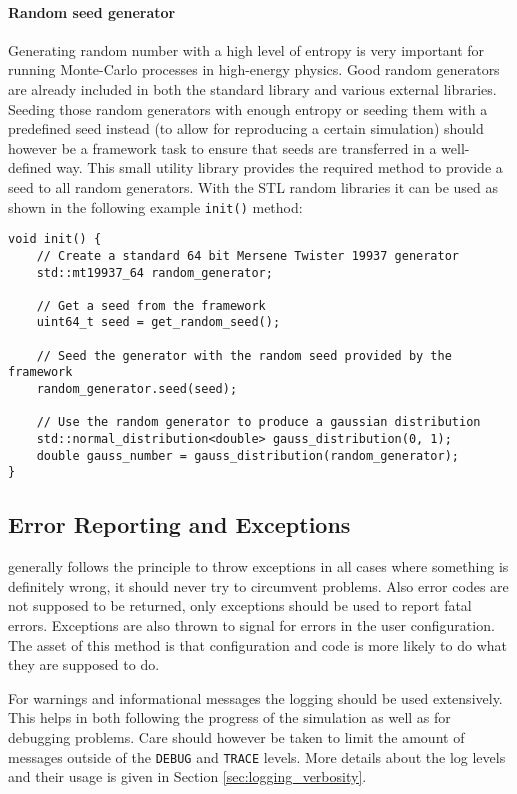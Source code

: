 \paragraph{Random seed generator}
\label{sec:random_generator}
Generating random number with a high level of entropy is very important for running Monte-Carlo processes in high-energy physics. Good random generators are already included in both the standard library and various external libraries. Seeding those random generators with enough entropy or seeding them with a predefined seed instead (to allow for reproducing a certain simulation) should however be a framework task to ensure that seeds are transferred in a well-defined way. This small utility library provides the required method to provide a seed to all random generators. With the STL random libraries it can be used as shown in the following example \texttt{init()} method:

\begin{verbatim}
void init() {
    // Create a standard 64 bit Mersene Twister 19937 generator
    std::mt19937_64 random_generator;
    
    // Get a seed from the framework
    uint64_t seed = get_random_seed();
    
    // Seed the generator with the random seed provided by the framework
    random_generator.seed(seed);
    
    // Use the random generator to produce a gaussian distribution
    std::normal_distribution<double> gauss_distribution(0, 1);
    double gauss_number = gauss_distribution(random_generator);
}
\end{verbatim}

\subsection{Error Reporting and Exceptions}
\label{sec:error_reporting_exceptions}
\apsq generally follows the principle to throw exceptions in all cases where something is definitely wrong, it should never try to circumvent problems. Also error codes are not supposed to be returned, only exceptions should be used to report fatal errors. Exceptions are also thrown to signal for errors in the user configuration. The asset of this method is that configuration and code is more likely to do what they are supposed to do.

For warnings and informational messages the logging should be used extensively. This helps in both following the progress of the simulation as well as for debugging problems. Care should however be taken to limit the amount of messages outside of the \texttt{DEBUG} and \texttt{TRACE} levels. More details about the log levels and their usage is given in Section \ref{sec:logging_verbosity}.

